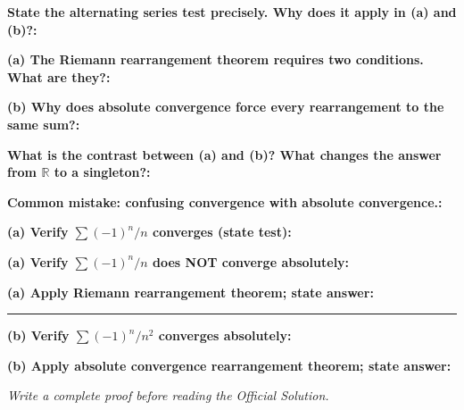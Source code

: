 \documentclass[12pt]{article}
\newcommand{\fillfield}[1]{%
  \par\noindent\textbf{#1:}\enspace\hrulefill\par\vspace{3pt}%
}
\newcommand{\writespace}[1]{\vspace{#1}}
\begin{document}
\bigskip

\begin{tcolorbox}[
  enhanced, breakable,
  colback  = pass3orange,
  colframe = orange!65!black,
  fonttitle = \bfseries,
  title = {Pass 3 \enspace\textbf{--}\enspace Self-Explanation}
]
\fillfield{State the alternating series test precisely. Why does it apply in (a) and (b)?}
\fillfield{(a) The Riemann rearrangement theorem requires two conditions. What are they?}
\fillfield{(b) Why does absolute convergence force every rearrangement to the same sum?}
\fillfield{What is the contrast between (a) and (b)? What changes the answer from $\mathbb{R}$ to a singleton?}
\fillfield{Common mistake: confusing convergence with absolute convergence.}
\end{tcolorbox}

\newpage

\begin{tcolorbox}[
  enhanced, breakable,
  colback  = pass4purple,
  colframe = purple!55!black,
  fonttitle = \bfseries,
  title = {Pass 4 \enspace\textbf{--}\enspace Skeleton Proof}
]
\noindent\textbf{(a) Verify $\sum(-1)^n/n$ converges (state test):}\par
\writespace{1.2cm}
\noindent\textbf{(a) Verify $\sum(-1)^n/n$ does NOT converge absolutely:}\par
\writespace{1.2cm}
\noindent\textbf{(a) Apply Riemann rearrangement theorem; state answer:}\par
\writespace{1.2cm}

\noindent\rule{\linewidth}{0.4pt}\vspace{2pt}

\noindent\textbf{(b) Verify $\sum(-1)^n/n^2$ converges absolutely:}\par
\writespace{1.2cm}
\noindent\textbf{(b) Apply absolute convergence rearrangement theorem; state answer:}\par
\writespace{1.2cm}
\end{tcolorbox}

\newpage

\begin{tcolorbox}[
  enhanced, breakable,
  colback  = pass5gray,
  colframe = black!38,
  fonttitle = \bfseries,
  title = {Pass 5 \enspace\textbf{--}\enspace Full Proof Attempt}
]
\small\itshape Write a complete proof before reading the Official Solution.\par
\normalfont\normalsize
\writespace{19cm}
\end{tcolorbox}

\newpage
\end{document}
